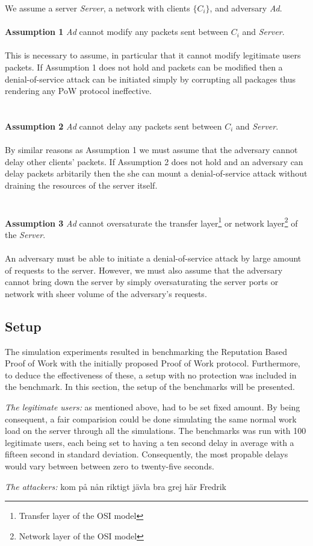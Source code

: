 We assume a server \emph{Server}, a network with clients \emph{$\{C_i\}$}, and adversary \emph{Ad}.
\\
\\
\noindent \textbf{Assumption 1} \indent \emph{Ad} cannot modify any packets sent between \emph{$C_i$} and \emph{Server}.
\\
\\
This is necessary to assume, in particular that it cannot modify legitimate users packets. If Assumption 1 does not hold and packets can be modified then a denial-of-service attack can be initiated simply by corrupting all packages thus rendering any PoW protocol ineffective.
\\
\\
\\
\noindent \textbf{Assumption 2} \indent \emph{Ad} cannot delay any packets sent between \emph{$C_i$} and \emph{Server}.
\\
\\
By similar reasons as Assumption 1 we must assume that the adversary cannot delay other clients' packets. If Assumption 2 does not hold and an adversary can delay packets arbitarily then the she can mount a denial-of-service attack without draining the resources of the server itself.
\\
\\
\\
\noindent \textbf{Assumption 3} \indent \emph{Ad} cannot oversaturate the transfer layer\footnote{Transfer layer of the OSI model} or network layer\footnote{Network layer of the OSI model} of the \emph{Server}.
\\
\\
An adversary must be able to initiate a denial-of-service attack by large amount of requests to the server. However, we must also assume that the adversary cannot bring down the server by simply oversaturating the server ports or network with sheer volume of the adversary's requests.

\subsection{Setup}
The simulation experiments resulted in benchmarking the Reputation Based Proof of Work with the initially proposed Proof of Work protocol. Furthermore, to deduce the effectiveness of these, a setup with no protection was included in the benchmark. In this section, the setup of the benchmarks will be presented.

\emph{The legitimate users:} as mentioned above, had to be set fixed amount. By being consequent, a fair comparision could be done simulating the same normal work load on the server through all the simulations. The benchmarks was run with 100 legitimate users, each being set to having a ten second delay in average with a fifteen second in standard deviation. Consequently, the most propable delays would vary between between zero to twenty-five seconds.

\emph{The attackers:} {\color{red}kom på nån riktigt jävla bra grej här Fredrik}

